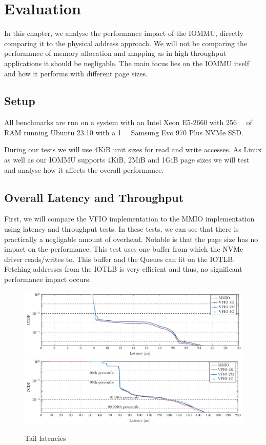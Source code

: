 \chapter{Evaluation}
In this chapter, we analyse the performance impact of the IOMMU, directly comparing it to the physical address approach. We will not be comparing the performance of memory allocation and mapping as in high throughput applications it should be negligable. The main focus lies on the IOMMU itself and how it performs with different page sizes.

\section{Setup}
All benchmarks are run on a system with an Intel Xeon E5-2660 with \qty{256}{\giga\byte} of RAM running Ubuntu 23.10 with a \qty{1}{\tera\byte} Samsung Evo 970 Plus NVMe SSD.

During our tests we will use 4KiB unit sizes for read and write accesses.
As Linux as well as our IOMMU supports 4KiB, 2MiB and 1GiB page sizes we will test and analyse how it affects the overall performance.

\section{Overall Latency and Throughput}
First, we will compare the VFIO implementation to the MMIO implementation using latency and throughput tests. In these tests, we can see that there is practically a negligable amount of overhead. Notable is that the page size has no impact on the performance.
This test uses one buffer from which the NVMe driver reads/writes to. This buffer and the Queues can fit on the IOTLB. Fetching addresses from the IOTLB is very efficient and thus, no significant performance impact occurs.

\begin{figure}
    \centering
     {\includegraphics[width=\textwidth]{figures/latency_ccdf_write} \label{fig:ccdf-write}}
     {\includegraphics[width=\textwidth]{figures/latency_ccdf_read} \label{fig:ccdf-read}}
    \caption{Tail latencies}
    \label{fig:ccdf}
\end{figure}

